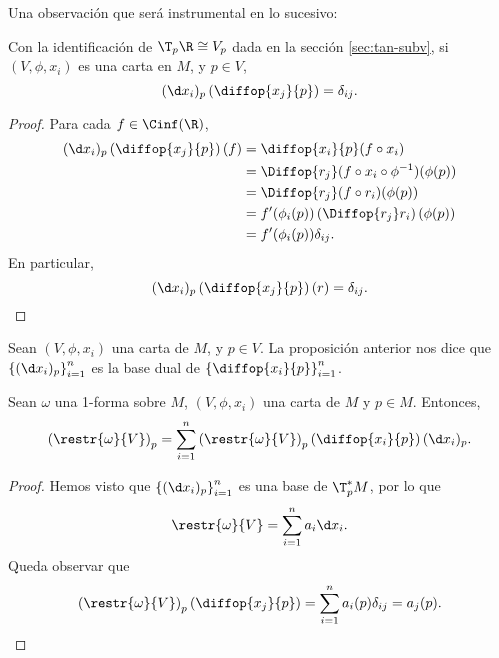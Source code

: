Una observación que será instrumental en lo sucesivo:
\begin{nprop}
  Con la identificación de $\T_{p}\R \cong V_{p}$ dada en la sección
  \ref{sec:tan-subv}, si $(V,\phi,x_{i})$ es una carta en $M$, y $p\in V$,
  \[
    (\d x_{i})_{p}\left( \diffop{x_{j}}{p} \right) = \delta_{ij}
  .\]
\end{nprop}
\begin{proof}
  Para cada $f\in\Cinf(\R)$,
  \begin{align*}
    (\d x_{i})_{p}\left( \diffop{x_{j}}{p} \right)(f) & = \diffop{x_{i}}{p}(f\circ
                                                     x_{i}) \\
                                                   & = \Diffop{r_{j}}(f\circ
                                                     x_{i}\circ
                                                     \phi^{-1})(\phi(p)) \\
                                                   & = \Diffop{r_{j}} (f\circ
                                                     r_{i})(\phi(p)) \\
                                                   & = f'(\phi_{i}(p))
                                                     \left(\Diffop{r_{j}}
                                                     r_{i}\right)(\phi(p)) \\
                                                   & = f'(\phi_{i}(p))\delta_{ij}.
  \end{align*}
  En particular,
  \[
   (\d x_{i})_{p}\left( \diffop{x_{j}}{p} \right)(r) = \delta_{ij}
  .\]
\end{proof}

\begin{ejemplo}
  Sean $(V,\phi,x_{i})$ una carta de $M$, y $p\in V$. La proposición anterior
  nos dice que $\left\{ (\d x_{i})_{p} \right\}_{i=1}^{n}$ es la base dual de $\left\{ \diffop{x_{i}}{p} \right\}_{i=1}^{n}$.
\end{ejemplo}

\begin{nprop}
  Sean $\omega$ una 1-forma sobre $M$, $(V,\phi,x_{i})$ una carta de $M$ y $p\in
  M$. Entonces,
  \[
    \left(\restr{\omega}{V}\right)_{p} = \sum_{i=1}^{n} \left( \restr{\omega}{V} \right)_{p}\left( \diffop{x_{i}}{p} \right) (\d x_{i})_{p}
  .\]
\end{nprop}
\begin{proof}
  Hemos visto que $\left\{ (\d x_{i})_{p} \right\}_{i=1}^{n}$ es una base de
  $\T_{p}^{*}M$, por lo que
  \[
    \restr{\omega}{V} = \sum_{i=1}^{n}a_{i}\d x_{i}
    .\]
  Queda observar que
  \[
    \left(\restr{\omega}{V}\right)_{p}\left( \diffop{x_{j}}{p} \right) =
    \sum_{i=1}^{n}a_{i}(p)\delta_{ij} = a_{j}(p)
  .\]
\end{proof}

